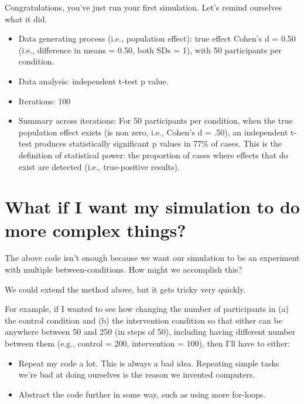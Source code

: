 \documentclass[
]{article}
\providecommand{\tightlist}{%
  \setlength{\itemsep}{0pt}\setlength{\parskip}{0pt}}
\begin{document}
Congratulations, you've just run your first simulation. Let's remind
ourselves what it did.

\begin{itemize}
\tightlist
\item
  Data generating process (i.e., population effect): true effect Cohen's
  d = 0.50 (i.e., difference in means = 0.50, both SDs = 1), with 50
  participants per condition.
\item
  Data analysis: independent t-test p value.
\item
  Iterations: 100
\item
  Summary across iterations: For 50 participants per condition, when the
  true population effect exists (is non zero, i.e., Cohen's d = .50), an
  independent t-test produces statistically significant p values in 77\%
  of cases. This is the definition of statistical power: the proportion
  of cases where effects that do exist are detected (i.e., true-positive
  results).
\end{itemize}

\hypertarget{what-if-i-want-my-simulation-to-do-more-complex-things}{%
\section{What if I want my simulation to do more complex
things?}\label{what-if-i-want-my-simulation-to-do-more-complex-things}}

The above code isn't enough because we want our simulation to be an
experiment with multiple between-conditions. How might we accomplish
this?

We could extend the method above, but it gets tricky very quickly.

For example, if I wanted to see how changing the number of participants
in (a) the control condition and (b) the intervention condition so that
either can be anywhere between 50 and 250 (in steps of 50), including
having different number between them (e.g., control = 200, intervention
= 100), then I'll have to either:

\begin{itemize}
\tightlist
\item
  Repeat my code a lot. This is always a bad idea. Repeating simple
  tasks we're bad at doing ourselves is the reason we invented
  computers.
\item
  Abstract the code further in some way, such as using more for-loops.
\end{itemize}
\end{document}
